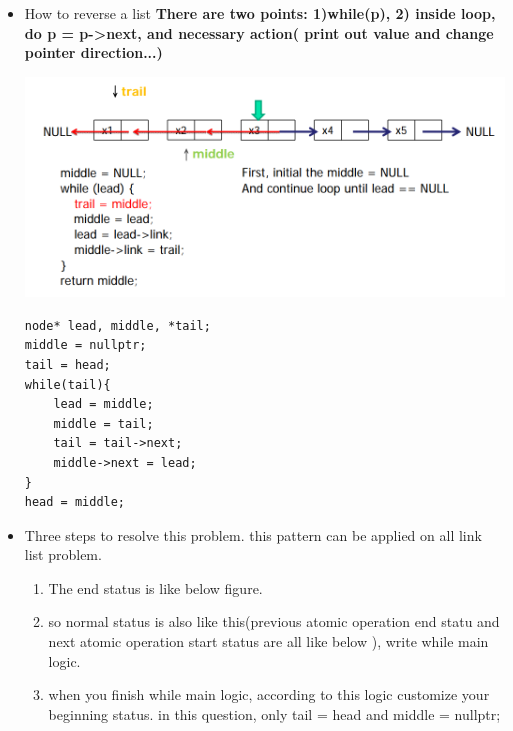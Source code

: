\documentclass[a4paper,11pt,twoside]{book}
\begin{document}
\begin{itemize}
	\item How to reverse a list \textbf{ There are two points: 1)while(p),  2) inside loop, do p = p->next, and necessary action( print out value and change pointer direction...)}

\begin{center}
\includegraphics[scale=0.65]{pics/reverse.png} 
\end{center}

\begin{lstlisting}[breaklines]
node* lead, middle, *tail;
middle = nullptr;
tail = head;
while(tail){
	lead = middle;
	middle = tail;
	tail = tail->next;
	middle->next = lead;
}
head = middle;
\end{lstlisting}


%
\item Three steps to resolve this problem. this pattern can be applied on all link list problem. 
\begin{enumerate}
	\item The end status is like below figure.
	
	\item so normal status is also like this(previous atomic operation end statu and next atomic operation start status are all like below ), write while main logic.
	
	\item when you finish while main logic, according to this logic customize your beginning status. in this question, only tail = head and middle = nullptr;
\end{enumerate}


\end{itemize}
\end{document}
